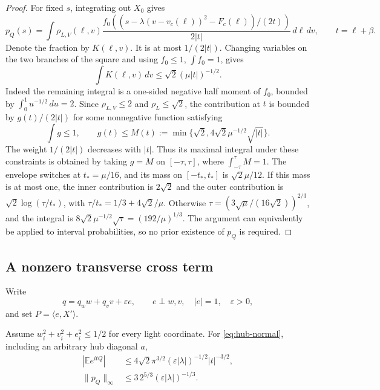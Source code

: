 \begin{proof}
For fixed $s$, integrating out $X_0$ gives
\[
 p_Q(s)=\int\rho_{L,V}(\ell,v)
 \frac{f_0((s-\lambda(v-v_c(\ell))^2-F_c(\ell))/(2t))}
      {2|t|}\,d\ell\,dv,
 \qquad t=\ell+\beta.
\]
Denote the fraction by $K(\ell,v)$.  It is at most $1/(2|t|)$.
Changing variables on the two branches of the square and using
$f_0\le1$, $\int f_0=1$, gives
\[
 \int K(\ell,v)\,dv\le\sqrt2(\mu|t|)^{-1/2}.
\]
Indeed the remaining integral is a one-sided negative half moment of
$f_0$, bounded by $\int_0^1u^{-1/2}\,du=2$.
Since $\rho_{L,V}\le2$ and $\rho_L\le\sqrt2$, the contribution at $t$
is bounded by $g(t)/(2|t|)$ for some nonnegative function satisfying
\[
 \int g\le1,\qquad
 g(t)\le M(t):=\min\{\sqrt2,4\sqrt2\mu^{-1/2}\sqrt{|t|}\}.
\]
The weight $1/(2|t|)$ decreases with $|t|$.  Thus its maximal integral
under these constraints is obtained by taking $g=M$ on
$[-\tau,\tau]$, where $\int_{-\tau}^{\tau}M=1$.
The envelope switches at $t_* =\mu/16$, and its mass on
$[-t_*,t_*]$ is $\sqrt2\mu/12$.
If this mass is at most one, the inner contribution is $2\sqrt2$ and
the outer contribution is $\sqrt2\log(\tau/t_*)$, with
$\tau/t_*=1/3+4\sqrt2/\mu$.
Otherwise
$\tau=(3\sqrt\mu/(16\sqrt2))^{2/3}$, and the integral is
$8\sqrt2\mu^{-1/2}\sqrt\tau=(192/\mu)^{1/3}$.
The argument can equivalently be applied to interval probabilities,
so no prior existence of $p_Q$ is required.
\end{proof}

\subsection{A nonzero transverse cross term}

Write
\[
 q=q_ww+q_vv+\varepsilon e,\qquad
 e\perp w,v,\quad |e|=1,\quad\varepsilon>0,
\]
and set $P=\langle e,X'\rangle$.

\begin{theorem}\label{thm:hub-leak}
Assume $w_i^2+v_i^2+e_i^2\le1/2$ for every light coordinate.  For
\eqref{eq:hub-normal}, including an arbitrary hub diagonal $a$,
\begin{align}
 |\mathbb E e^{itQ}|&\le
 4\sqrt2\pi^{3/2}(\varepsilon|\lambda|)^{-1/2}|t|^{-3/2},
 \label{eq:hub-leak-fourier}\\
 \|p_Q\|_\infty&\le
 3\,2^{5/3}(\varepsilon|\lambda|)^{-1/3}.
 \label{eq:hub-leak-density}
\end{align}
\end{theorem}

